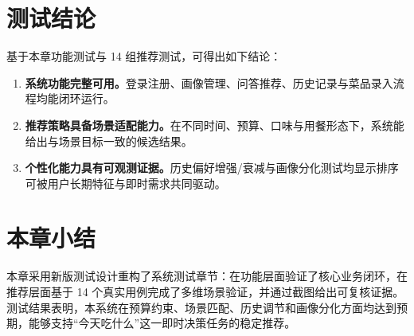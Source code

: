 \section{测试结论}

基于本章功能测试与 14 组推荐测试，可得出如下结论：

\begin{enumerate}[label=\arabic*., leftmargin=2em, itemsep=0.2em]
\item \textbf{系统功能完整可用。}登录注册、画像管理、问答推荐、历史记录与菜品录入流程均能闭环运行。

\item \textbf{推荐策略具备场景适配能力。}在不同时间、预算、口味与用餐形态下，系统能给出与场景目标一致的候选结果。

\item \textbf{个性化能力具有可观测证据。}历史偏好增强/衰减与画像分化测试均显示排序可被用户长期特征与即时需求共同驱动。
\end{enumerate}

\section{本章小结}

本章采用新版测试设计重构了系统测试章节：在功能层面验证了核心业务闭环，在推荐层面基于 14 个真实用例完成了多维场景验证，并通过截图给出可复核证据。测试结果表明，本系统在预算约束、场景匹配、历史调节和画像分化方面均达到预期，能够支持“今天吃什么”这一即时决策任务的稳定推荐。
